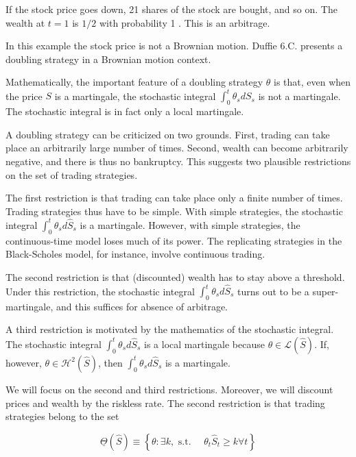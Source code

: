 \documentclass[\topdir/lecture\_notes.tex]{subfiles}
\begin{document}
If the stock price goes down, 21 shares of the stock are bought, and so on. The wealth at $t=1$ is $1 / 2$ with probability 1 . This is an arbitrage.

In this example the stock price is not a Brownian motion. Duffie 6.C. presents a doubling strategy in a Brownian motion context.

Mathematically, the important feature of a doubling strategy $\theta$ is that, even when the price $S$ is a martingale, the stochastic integral $\int_{0}^{t} \theta_{s} d S_{s}$ is not a martingale. The stochastic integral is in fact only a local martingale.

A doubling strategy can be criticized on two grounds. First, trading can take place an arbitrarily large number of times. Second, wealth can become arbitrarily negative, and there is thus no bankruptcy. This suggests two plausible restrictions on the set of trading strategies.

The first restriction is that trading can take place only a finite number of times. Trading strategies thus have to be simple. With simple strategies, the stochastic integral $\int_{0}^{t} \theta_{s} d \hat{S}_{s}$ is a martingale. However, with simple strategies, the continuous-time model loses much of its power. The replicating strategies in the Black-Scholes model, for instance, involve continuous trading.

The second restriction is that (discounted) wealth has to stay above a threshold. Under this restriction, the stochastic integral $\int_{0}^{t} \theta_{s} d \hat{S}_{s}$ turns out to be a super-martingale, and this suffices for absence of arbitrage.

A third restriction is motivated by the mathematics of the stochastic integral. The stochastic integral $\int_{0}^{t} \theta_{s} d \hat{S}_{s}$ is a local martingale because $\theta \in \mathcal{L}(\hat{S})$. If, however, $\theta \in \mathcal{H}^{2}(\hat{S})$, then $\int_{0}^{t} \theta_{s} d \hat{S}_{s}$ is a martingale.

We will focus on the second and third restrictions. Moreover, we will discount prices and wealth by the riskless rate. The second restriction is that trading strategies belong to the set

\begin{equation*}
\underline{\Theta}(\hat{S}) \equiv\left\{\theta: \exists k, \text { s.t. } \quad \theta_{t} \hat{S}_{t} \geq k \forall t\right\}
\end{equation*}
\end{document}
